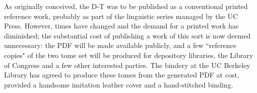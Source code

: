 As originally conceived, the D-T was to be published as a conventional printed reference work, probably as part of the linguistic series managed by the UC Press.  However, times have changed and the demand for a printed work has diminished; the substantial cost of publishing a work of this sort is now deemed unnecessary: the PDF will be made available publicly, and a few ``reference copies" of the two tome set will be produced for depository libraries, the Library of Congress and a few other interested parties.  The bindery at the UC Berkeley Library has agreed to produce these tomes from the generated PDF at cost, provided a handsome imitation leather cover and a hand-stitched binding.
